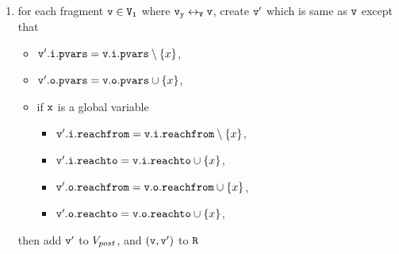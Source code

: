 \begin{itemize}
\begin{enumerate}
\item for each fragment $\tt v \in V_1$ where $\tt \mathtt{v}_y \leftrightarrow_{V} v$, create $\tt v'$ which is same as $\tt v$ except that
\begin{itemize} 
\item $\mathtt{v}'.\mathtt{i}.\mathtt{pvars} = \mathtt{v}.\mathtt{i}.\mathtt{pvars} \setminus \left\{x\right\}$,
\item $\mathtt{v}'.\mathtt{o}.\mathtt{pvars} = \mathtt{v}.\mathtt{o}.\mathtt{pvars} \cup \left\{x\right\}$,
\item if $\tt x$ is a global variable
\begin{itemize}
\item $\mathtt{v}'.\mathtt{i}.\mathtt{reachfrom} = \mathtt{v}.\mathtt{i}.\mathtt{reachfrom} \setminus \left\{x\right\}$,
\item $\mathtt{v}'.\mathtt{i}.\mathtt{reachto} = \mathtt{v}.\mathtt{i}.\mathtt{reachto} \cup \left\{x\right\}$,
 \item $\mathtt{v}'.\mathtt{o}.\mathtt{reachfrom} = \mathtt{v}.\mathtt{o}.\mathtt{reachfrom} \cup \left\{x\right\}$,
 \item $\mathtt{v}'.\mathtt{o}.\mathtt{reachto} = \mathtt{v}.\mathtt{o}.\mathtt{reachto} \cup \left\{x\right\}$,
\end{itemize}
\end{itemize}
then add $\tt v'$ to $V_{post}$, and $\tt (v,v')$ to $\tt R$


\end{enumerate}
\end{itemize}
